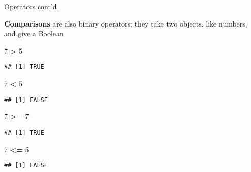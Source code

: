 \documentclass[8pt,ignorenonframetext,]{beamer}
\newenvironment{Shaded}{\begin{snugshade}}{\end{snugshade}}
\newcommand{\DecValTok}[1]{\textcolor[rgb]{0.00,0.00,0.81}{#1}}
\newcommand{\StringTok}[1]{\textcolor[rgb]{0.31,0.60,0.02}{#1}}
\newcommand{\OperatorTok}[1]{\textcolor[rgb]{0.81,0.36,0.00}{\textbf{#1}}}
\begin{document}
\begin{frame}[fragile]{Operators cont'd.}

\textbf{Comparisons} are also binary operators; they take two objects,
like numbers, and give a Boolean

\begin{Shaded}
\begin{Highlighting}[]
\DecValTok{7} \OperatorTok{>}\StringTok{ }\DecValTok{5}
\end{Highlighting}
\end{Shaded}

\begin{verbatim}
## [1] TRUE
\end{verbatim}

\begin{Shaded}
\begin{Highlighting}[]
\DecValTok{7} \OperatorTok{<}\StringTok{ }\DecValTok{5}
\end{Highlighting}
\end{Shaded}

\begin{verbatim}
## [1] FALSE
\end{verbatim}

\begin{Shaded}
\begin{Highlighting}[]
\DecValTok{7} \OperatorTok{>=}\StringTok{ }\DecValTok{7}
\end{Highlighting}
\end{Shaded}

\begin{verbatim}
## [1] TRUE
\end{verbatim}

\begin{Shaded}
\begin{Highlighting}[]
\DecValTok{7} \OperatorTok{<=}\StringTok{ }\DecValTok{5}
\end{Highlighting}
\end{Shaded}

\begin{verbatim}
## [1] FALSE
\end{verbatim}

\end{frame}
\end{document}
